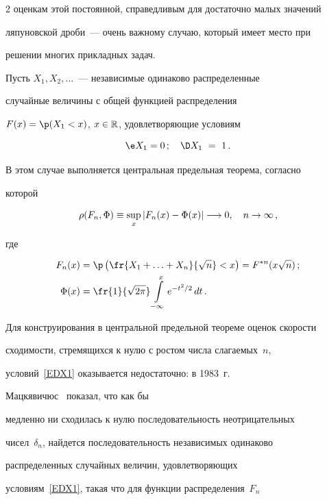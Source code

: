 \begin{multicols}{2}
оценкам этой постоянной, справедливым для достаточно малых значений


ляпуновской дроби~--- очень важному случаю, который имеет место при


решении многих прикладных задач.





Пусть $X_1,X_2,\ldots$~--- независимые одинаково распределенные


случайные величины с общей функцией распределения


${F(x)=\p(X_1<x)}$, ${x\in\mathbb R}$, удов\-ле\-тво\-ря\-ющие условиям


\begin{equation}


\label{EDX1}


\e X_1 =  0\,;\quad\D X_1\ =\ 1\,.


\end{equation}


В этом случае выполняется центральная предельная теорема, согласно


которой


$$


\rho(F_n,\Phi)\equiv\sup_x|F_n(x)-\Phi(x)|\To 0,\quad n\to\infty\,,


$$


где


\begin{align*}


F_n(x)&=\p\left(\fr{X_1+\ldots+X_n} {\sqrt n}<x\right)=F^{*n}(x\sqrt n)\,;\\


\Phi(x)&=\fr{1}{\sqrt{2\pi}}\int\limits_{-\infty}^x e^{-t^2/2}\,dt\,.


\end{align*}


Для конструирования в центральной предельной теореме оценок скорости


сходимости, стремящихся к нулю с ростом числа слагаемых~$n$,


условий~\eqref{EDX1} оказывается недостаточно: в 1983~г.\


Мацкявичюс~\cite{Matskjavichus1983} показал, что как бы


медленно ни сходилась к нулю последовательность неотрицательных


чисел~$\delta_n$, найдется последовательность независимых одинаково


распределенных случайных величин, удовлетворяющих


условиям~\eqref{EDX1}, такая что для функции распределения~$F_n$



\end{multicols}
